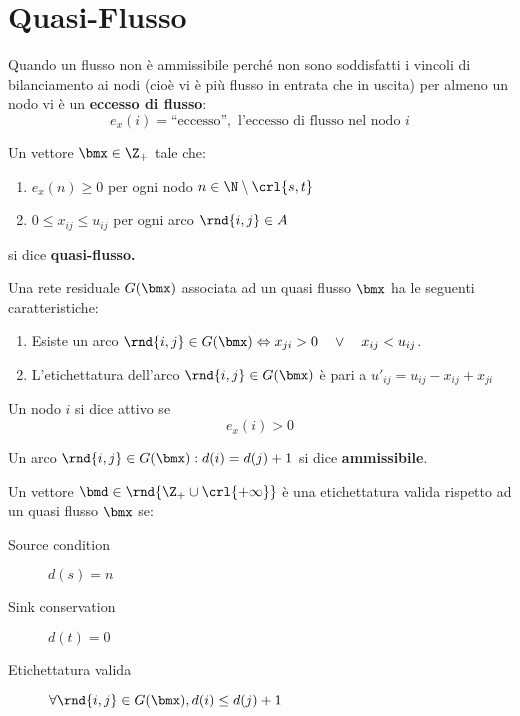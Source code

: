 \documentclass[\main/main.tex]{subfiles}
\begin{document}
\section{Quasi-Flusso}
\begin{definition}
  Quando un flusso non è ammissibile perché non sono soddisfatti i vincoli di bilanciamento ai nodi (cioè vi è più flusso in entrata che in uscita) per almeno un nodo vi è un \textbf{eccesso di flusso}:
  \[
    e_x(i)=\text{``eccesso''}, \text{ l'eccesso di flusso nel nodo \(i\)}
  \]
\end{definition}
\begin{definition}
  Un vettore \(\bmx \in \Z_+\) tale che:
  \begin{enumerate}
    \item \(e_x(n) \geq 0\) per ogni nodo \(n \in \N \setminus \crl{s,t}\)
    \item \(0 \leq x_{ij} \leq u_{ij}\) per ogni arco \(\rnd{i,j} \in A\)
  \end{enumerate}
  si dice \textbf{quasi-flusso.}
\end{definition}

\begin{definition}
  Una rete residuale \(G(\bmx)\) associata ad un quasi flusso \(\bmx\) ha le seguenti caratteristiche:
  \begin{enumerate}
    \item Esiste un arco \(\rnd{i,j} \in G(\bmx) \Leftrightarrow x_{ji} > 0 \quad \lor \quad x_{ij} < u_{ij}\).
    \item L'etichettatura dell'arco \(\rnd{i,j} \in G(\bmx)\) è pari a \(u'_{ij} = u_{ij} - x_{ij} + x_{ji}\)
  \end{enumerate}
\end{definition}

\begin{definition}
  Un nodo \(i\) si dice attivo se \[e_x(i) > 0\]
\end{definition}
\begin{definition}
  Un arco \(\rnd{i,j} \in G(\bmx):  d(i) = d(j) +1\) si dice \textbf{ammissibile}.
\end{definition}
\begin{definition}
  Un vettore \(\bmd \in \rnd{\Z_+ \cup \crl{+\infty}}\) è una etichettatura valida rispetto ad un quasi flusso \(\bmx\) se:
  \begin{description}
    \item[Source condition] \(d(s) = n\)
    \item[Sink conservation] \(d(t) = 0\)
    \item[Etichettatura valida]\(\forall \rnd{i,j} \in G(\bmx), d(i) \leq d(j) +1\)
  \end{description}
\end{definition}
\clearpage
\end{document}
